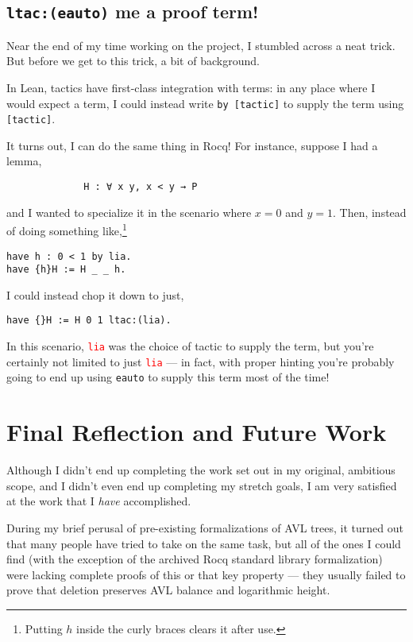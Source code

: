 \documentclass[acmsmall, authorversion, nonacm, overload]{acmart}
\begin{document}
\subsection{\texttt{ltac:(eauto)} me a proof term!}

Near the end of my time working on the project, I stumbled across a neat trick.
But before we get to this trick, a bit of background.

In Lean, tactics have first-class integration with terms:
in any place where I would expect a term, I could instead write \texttt{by [tactic]}
to supply the term using \verb|[tactic]|.

It turns out, I can do the same thing in Rocq!
For instance, suppose I had a lemma,
\begin{figure}[h!]
  \centering
  \begin{minipage}{0.5\textwidth}
    \begin{verbatim}
        H : ∀ x y, x < y → P
    \end{verbatim}
  \end{minipage}
  \end{figure}

and I wanted to specialize it in the scenario where $x = 0$ and $y = 1$.
Then, instead of doing something like,\footnote{Putting $h$ inside the curly braces clears it after use.}
\begin{verbatim}
have h : 0 < 1 by lia.
have {h}H := H _ _ h.
\end{verbatim}
I could instead chop it down to just,
\begin{verbatim}
have {}H := H 0 1 ltac:(lia).
\end{verbatim}
In this scenario, \texttt{\textcolor{red}{lia}} was the choice of tactic to supply the term,
but you're certainly not limited to just \texttt{\textcolor{red}{lia}} ---
in fact, with proper hinting you're probably going to end up using \texttt{eauto}
to supply this term most of the time!

\section{Final Reflection and Future Work}
Although I didn't end up completing the work set out in my original, ambitious scope,
and I didn't even end up completing my stretch goals,
I am very satisfied at the work that I \emph{have} accomplished.

During my brief perusal of pre-existing formalizations of AVL trees,
it turned out that many people have tried to take on the same task,
but all of the ones I could find (with the exception of the archived Rocq standard library formalization)
were lacking complete proofs of this or that key property ---
they usually failed to prove that deletion preserves AVL balance and logarithmic height.
\end{document}
